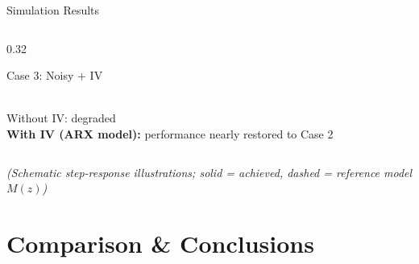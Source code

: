 \documentclass[aspectratio=169]{beamer}
\newcommand{\highlight}[1]{{\color{accentblue}\textbf{#1}}}
\begin{document}
\begin{frame}{Simulation Results}
\begin{columns}[T]
\begin{column}{0.32\textwidth}
\begin{block}{Case 3: Noisy + IV}
\\
        Without IV: degraded\\[0.2em]
        \highlight{With IV (ARX model):} performance nearly restored to Case 2
      \end{block}
    \end{column}
  \end{columns}
  \vspace{0.4em}
  \centering
  \small\textit{(Schematic step-response illustrations; solid = achieved, dashed = reference model $M(z)$)}
\end{frame}

\section{Comparison \& Conclusions}
\end{document}
